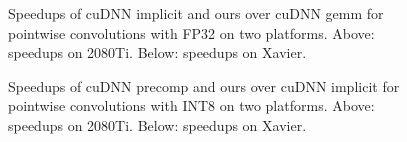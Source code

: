 \begin{figure}
\captionsetup[subfloat]{labelformat=empty,skip=0pt}
	\centering
\vspace{-5mm}
	\vspace{-6mm}
	\caption{Speedups of cuDNN implicit and ours over cuDNN gemm for pointwise convolutions with FP32 on two platforms. Above: speedups on 2080Ti. Below: speedups on Xavier.}
	\label{fig:pwspeedupfp32}
\end{figure}

\begin{figure}
\captionsetup[subfloat]{labelformat=empty,skip=0pt}

	\centering
	\vspace{-5mm}
	\vspace{-6mm}
	\caption{Speedups of cuDNN precomp and ours over cuDNN implicit for pointwise convolutions with INT8 on two platforms. Above: speedups on 2080Ti. Below: speedups on Xavier.}
	\label{fig:pwspeedupint8}
\end{figure}

